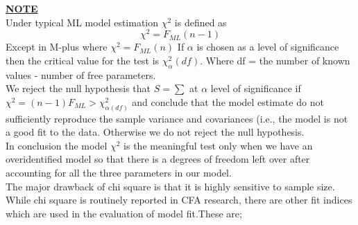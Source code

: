 \documentclass[12pt]{article}
\begin{document}
\noindent \textbf{\underline{NOTE}}\\
Under typical ML model estimation ${\chi}^2$ is defined as 
$$ {\chi}^2 = F_{ML}{(n-1)}$$ 
Except in M-plus where ${\chi}^2 = F_{ML}(n)$
If $\alpha$ is chosen as a level of significance then the critical value for the test is ${\chi}^2_\alpha (df)$. Where df = the number of known values - number of free parameters.\\
We reject the null hypothesis that $S= \sum$ at $\alpha$ level of significance if ${\chi}^2 = (n-1) F_{ML} > {\chi}^2_{\alpha (df)}$ and conclude that the model estimate do not sufficiently reproduce the sample variance and covariances (i.e., the model is not a good fit to the data. Otherwise we do not reject the null hypothesis.\\
In conclusion the model ${\chi}^2$ is the meaningful test only when we have an overidentified model so that there is a degrees of freedom left over after accounting for all the three parameters in our model.\\
The major drawback of chi square is that it is highly sensitive to sample size.
While chi square is routinely reported in CFA research, there are other fit indices which are used in the evaluation of model fit.These are;
\end{document}
